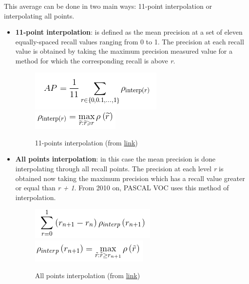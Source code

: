 \begin{itemize}
\begin{figure}[H]
\begin{center}
    \end{center}
    \end{figure}
    This average can be done in two main ways: 11-point interpolation or interpolating all points.
    \begin{itemize}
        \item \textbf{11-point interpolation}: is defined as the mean precision at a set of eleven equally-spaced recall values ranging from 0 to 1. The precision at each recall value is obtained by taking the maximum precision measured value for a method for which the corresponding recall is above \textit{r}.
        \begin{figure}[H]
        \begin{center}
        \includegraphics[scale=0.7]{figures/interp1.png}\\
        \includegraphics[scale=0.7]{figures/interp2.png}
        \caption{11-points interpolation (from \href{https://github.com/rafaelpadilla/Object-Detection-Metrics#11-point-interpolation}{link})}
        \end{center}
        \end{figure}
        \item \textbf{All points interpolation}: in this case the mean precision is done interpolating through all recall points. The precision at each level \textit{r} is obtained now taking the maximum precision which has a recall value greater or equal than \textit{r + 1}. From 2010 on, PASCAL VOC uses this method of interpolation.
        \begin{figure}[H]
        \begin{center}
        \includegraphics[scale=0.7]{figures/interp3.png}\\
        \includegraphics[scale=0.7]{figures/interp4.png}
        \caption{All points interpolation (from \href{https://github.com/rafaelpadilla/Object-Detection-Metrics#interpolating-all-points}{link})}
        \end{center}
        \end{figure}
        
    \end{itemize}
\end{itemize}

